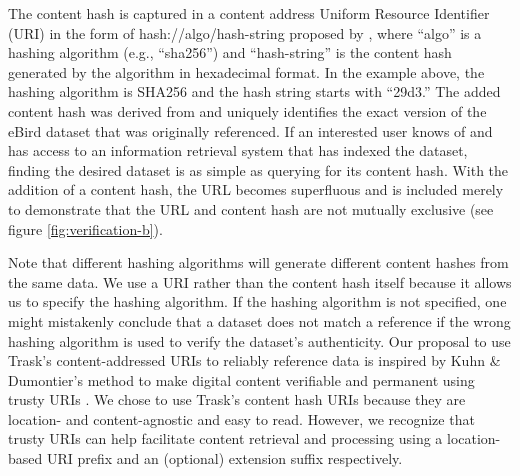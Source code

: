 The content hash is captured in a content address Uniform Resource Identifier (URI) \citep{rfc3986} in the form of hash://algo/hash-string proposed by \citep{Trask_2015}, where ``algo'' is a hashing algorithm (e.g., ``sha256'') and ``hash-string'' is the content hash generated by the algorithm in hexadecimal format. In the example above, the hashing algorithm is SHA256 and the hash string starts with ``29d3.'' The added content hash was derived from and uniquely identifies the exact version of the eBird dataset that was originally referenced. If an interested user knows of and has access to an information retrieval system that has indexed the dataset, finding the desired dataset is as simple as querying for its content hash. With the addition of a content hash, the URL becomes superfluous and is included merely to demonstrate that the URL and content hash are not mutually exclusive (see figure \ref{fig:verification-b}).

Note that different hashing algorithms will generate different content hashes from the same data. We use a URI rather than the content hash itself because it allows us to specify the hashing algorithm. If the hashing algorithm is not specified, one might mistakenly conclude that a dataset does not match a reference if the wrong hashing algorithm is used to verify the dataset's authenticity. Our proposal to use Trask's content-addressed URIs to reliably reference data is inspired by Kuhn \& Dumontier's method to make digital content verifiable and permanent using trusty URIs \citep{Kuhn_2015}. We chose to use Trask's content hash URIs because they are location- and content-agnostic and easy to read. However, we recognize that trusty URIs can help facilitate content retrieval and processing using a location-based URI prefix and an (optional) extension suffix respectively.

